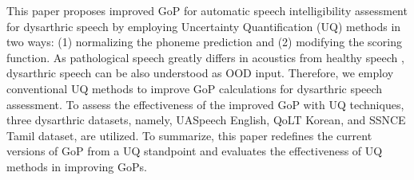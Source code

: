 




This paper proposes improved GoP for automatic speech intelligibility assessment for dysarthric speech by employing Uncertainty Quantification (UQ) methods in two ways: (1) normalizing the phoneme prediction and (2) modifying the scoring function.
As pathological speech greatly differs in acoustics from healthy speech \cite{wilson2000acoustic}, dysarthric speech can be also understood as OOD input.
Therefore, we employ conventional UQ methods to improve GoP calculations for dysarthric speech assessment.
To assess the effectiveness of the improved GoP with UQ techniques, three dysarthric datasets, namely, UASpeech English, QoLT Korean, and SSNCE Tamil dataset, are utilized. 
To summarize, this paper redefines the current versions of GoP from a UQ standpoint and evaluates the effectiveness of UQ methods in improving GoPs.




